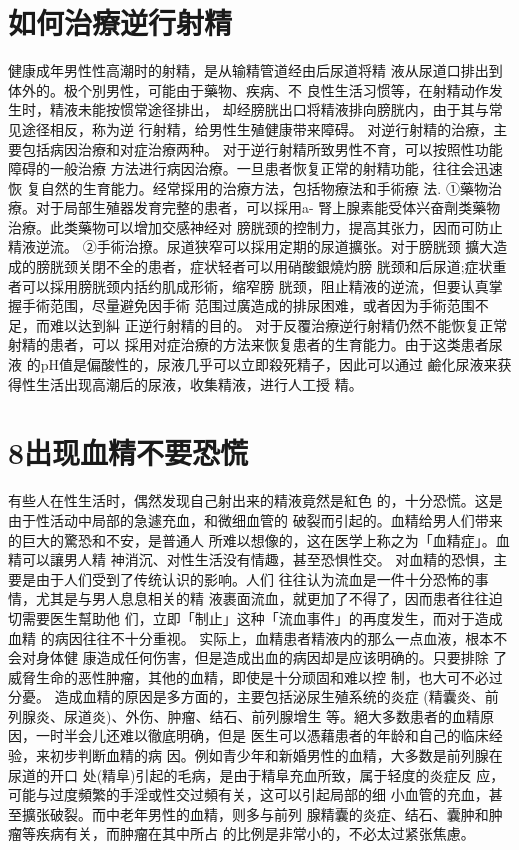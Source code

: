 \documentclass[12pt,UTF8]{ctexbook}
\begin{document}
\section{如何治療逆行射精}
健康成年男性性高潮时的射精，是从输精管道经由后尿道将精
液从尿道口排出到体外的。极个別男性，可能由于藥物、疾病、不
良性生活习惯等，在射精动作发生时，精液未能按惯常途径排出，
却经膀胱出口将精液排向膀胱内，由于其与常见途径相反，称为逆
行射精，给男性生殖健康带来障碍。
对逆行射精的治療，主要包括病因治療和对症治療两种。
对于逆行射精所致男性不育，可以按照性功能障碍的一般治療
方法进行病因治療。一旦患者恢复正常的射精功能，往往会迅速恢
复自然的生育能力。经常採用的治療方法，包括物療法和手術療
法.
①藥物治療。对于局部生殖器发育完整的患者，可以採用a-
腎上腺素能受体兴奋劑类藥物治療。此类藥物可以增加交感神经对
膀胱颈的控制力，提高其张力，因而可防止精液逆流。
②手術治撩。尿道狭窄可以採用定期的尿道擴张。对于膀胱颈
擴大造成的膀胱颈关閉不全的患者，症状轻者可以用硝酸銀燒灼膀
胱颈和后尿道;症状重者可以採用膀胱颈内括约肌成形術，缩窄膀
胱颈，阻止精液的逆流，但要认真掌握手術范围，尽量避免因手術
范围过廣造成的排尿困难，或者因为手術范围不足，而难以达到糾
正逆行射精的目的。
对于反覆治療逆行射精仍然不能恢复正常射精的患者，可以
採用对症治療的方法来恢复患者的生育能力。由于这类患者尿液
的pH值是偏酸性的，尿液几乎可以立即殺死精子，因此可以通过
鹼化尿液来获得性生活出现高潮后的尿液，收集精液，进行人工授
精。
\section{8出现血精不要恐慌}
有些人在性生活时，偶然发现自己射出来的精液竟然是紅色
的，十分恐慌。这是由于性活动中局部的急遽充血，和微细血管的
破裂而引起的。血精给男人们带来的巨大的驚恐和不安，是普通人
所难以想像的，这在医学上称之为「血精症」。血精可以讓男人精
神消沉、对性生活没有情趣，甚至恐惧性交。
对血精的恐惧，主要是由于人们受到了传统认识的影响。人们
往往认为流血是一件十分恐怖的事情，尤其是与男人息息相关的精
液裹面流血，就更加了不得了，因而患者往往迫切需要医生幫助他
们，立即「制止」这种「流血事件」的再度发生，而对于造成血精
的病因往往不十分重视。
实际上，血精患者精液内的那么一点血液，根本不会对身体健
康造成任何伤害，但是造成出血的病因却是应该明确的。只要排除
了威脅生命的恶性肿瘤，其他的血精，即使是十分顽固和难以控
制，也大可不必过分憂。
造成血精的原因是多方面的，主要包括泌尿生殖系统的炎症
(精囊炎、前列腺炎、尿道炎)、外伤、肿瘤、结石、前列腺增生
等。絕大多数患者的血精原因，一时半会儿还难以徹底明确，但是
医生可以憑藉患者的年龄和自己的临床经验，来初步判断血精的病
因。例如青少年和新婚男性的血精，大多数是前列腺在尿道的开口
处(精阜)引起的毛病，是由于精阜充血所致，属于轻度的炎症反
应，可能与过度頻繁的手淫或性交过頻有关，这可以引起局部的细
小血管的充血，甚至擴张破裂。而中老年男性的血精，则多与前列
腺精囊的炎症、结石、囊肿和肿瘤等疾病有关，而肿瘤在其中所占
的比例是非常小的，不必太过紧张焦慮。
\end{document}
